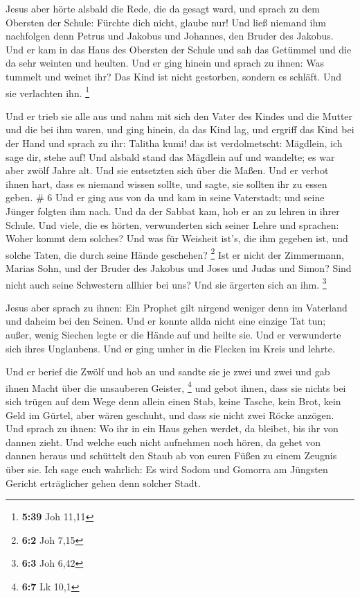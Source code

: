  Jesus aber hörte alsbald die Rede, die da gesagt ward,
und sprach zu dem Obersten der Schule: Fürchte dich nicht, glaube nur!
 Und ließ niemand ihm nachfolgen denn Petrus und Jakobus
und Johannes, den Bruder des Jakobus.  Und er kam in das
Haus des Obersten der Schule und sah das Getümmel und die da sehr
weinten und heulten.  Und er ging hinein und sprach zu
ihnen: Was tummelt und weinet ihr? Das Kind ist nicht gestorben, sondern
es schläft. Und sie verlachten ihn. \footnote{\textbf{5:39} Joh 11,11}

 Und er trieb sie alle aus und nahm mit sich den Vater
des Kindes und die Mutter und die bei ihm waren, und ging hinein, da das
Kind lag,  und ergriff das Kind bei der Hand und sprach
zu ihr: Talitha kumi! das ist verdolmetscht: Mägdlein, ich sage dir,
stehe auf!  Und alsbald stand das Mägdlein auf und
wandelte; es war aber zwölf Jahre alt. Und sie entsetzten sich über die
Maßen.  Und er verbot ihnen hart, dass es niemand wissen
sollte, und sagte, sie sollten ihr zu essen geben. \# 6 
Und er ging aus von da und kam in seine Vaterstadt; und seine Jünger
folgten ihm nach.  Und da der Sabbat kam, hob er an zu
lehren in ihrer Schule. Und viele, die es hörten, verwunderten sich
seiner Lehre und sprachen: Woher kommt dem solches? Und was für Weisheit
ist's, die ihm gegeben ist, und solche Taten, die durch seine Hände
geschehen? \footnote{\textbf{6:2} Joh 7,15}  Ist er nicht
der Zimmermann, Marias Sohn, und der Bruder des Jakobus und Joses und
Judas und Simon? Sind nicht auch seine Schwestern allhier bei uns? Und
sie ärgerten sich an ihm. \footnote{\textbf{6:3} Joh 6,42}

 Jesus aber sprach zu ihnen: Ein Prophet gilt nirgend
weniger denn im Vaterland und daheim bei den Seinen.  Und
er konnte allda nicht eine einzige Tat tun; außer, wenig Siechen legte
er die Hände auf und heilte sie.  Und er verwunderte sich
ihres Unglaubens. Und er ging umher in die Flecken im Kreis und lehrte.

 Und er berief die Zwölf und hob an und sandte sie je zwei
und zwei und gab ihnen Macht über die unsauberen Geister, \footnote{\textbf{6:7}
  Lk 10,1}  und gebot ihnen, dass sie nichts bei sich
trügen auf dem Wege denn allein einen Stab, keine Tasche, kein Brot,
kein Geld im Gürtel,  aber wären geschuht, und dass sie
nicht zwei Röcke anzögen.  Und sprach zu ihnen: Wo ihr in
ein Haus gehen werdet, da bleibet, bis ihr von dannen zieht.
 Und welche euch nicht aufnehmen noch hören, da gehet von
dannen heraus und schüttelt den Staub ab von euren Füßen zu einem
Zeugnis über sie. Ich sage euch wahrlich: Es wird Sodom und Gomorra am
Jüngsten Gericht erträglicher gehen denn solcher Stadt.

